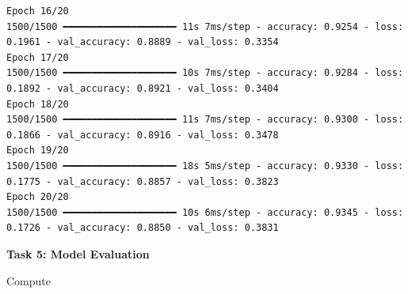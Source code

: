\documentclass[11pt]{article}
\begin{document}
\begin{itemize}
\begin{verbatim}
Epoch 16/20
1500/1500 ━━━━━━━━━━━━━━━━━━━━ 11s 7ms/step - accuracy: 0.9254 - loss: 0.1961 - val_accuracy: 0.8889 - val_loss: 0.3354
Epoch 17/20
1500/1500 ━━━━━━━━━━━━━━━━━━━━ 10s 7ms/step - accuracy: 0.9284 - loss: 0.1892 - val_accuracy: 0.8921 - val_loss: 0.3404
Epoch 18/20
1500/1500 ━━━━━━━━━━━━━━━━━━━━ 11s 7ms/step - accuracy: 0.9300 - loss: 0.1866 - val_accuracy: 0.8916 - val_loss: 0.3478
Epoch 19/20
1500/1500 ━━━━━━━━━━━━━━━━━━━━ 18s 5ms/step - accuracy: 0.9330 - loss: 0.1775 - val_accuracy: 0.8857 - val_loss: 0.3823
Epoch 20/20
1500/1500 ━━━━━━━━━━━━━━━━━━━━ 10s 6ms/step - accuracy: 0.9345 - loss: 0.1726 - val_accuracy: 0.8850 - val_loss: 0.3831
\end{verbatim}

\end{itemize}

\bigskip

\textbf{Task 5: Model Evaluation}

Compute
\end{document}
